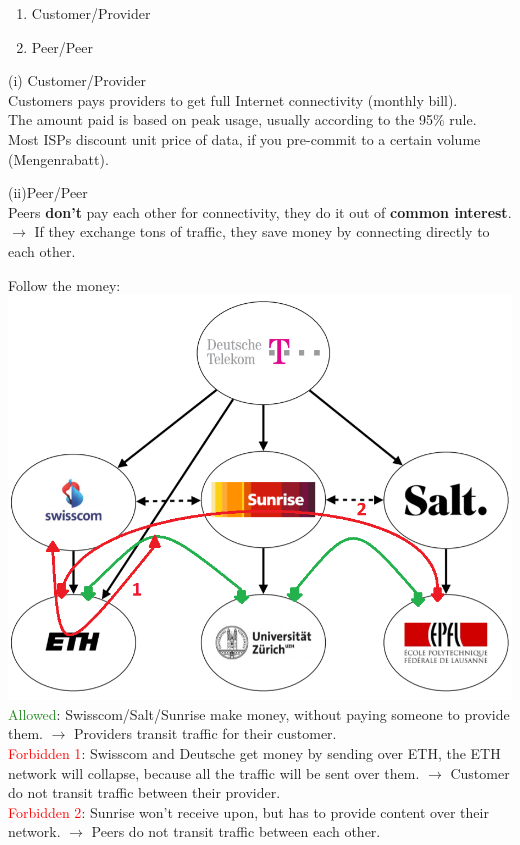 \documentclass[a4paper, fontsize=8pt, landscape, DIV=1]{scrartcl}
\begin{document}
\begin{multicols*}{4}
	 	\begin{enumerate}[label=(\roman*),noitemsep]
	 		\item Customer/Provider
	 		\item Peer/Peer
	 	\end{enumerate}
	 	(i) Customer/Provider\\
	 	Customers pays providers to get full Internet connectivity (monthly bill).\\
	 	The amount paid is based on peak usage, usually according to the 95\% rule.\\
	 	Most ISPs discount unit price of data, if you pre-commit to a certain volume (Mengenrabatt).\par 
	 	
	 	(ii)Peer/Peer\\
	 	Peers \textbf{don't} pay each other for connectivity, they do it out of \textbf{common interest}. $\rightarrow$ If they exchange tons of traffic, they save money by connecting directly to each other.\par 
	 	
	 	Follow the money:\\ 
	 	\includegraphics[width=\columnwidth]{images/Network_Layer/follow_the_money.png}
	 	\textcolor{ForestGreen}{Allowed}: Swisscom/Salt/Sunrise make money, without paying someone to provide them. $\rightarrow$ Providers transit traffic for their customer.\\ 
	 	\textcolor{Red}{Forbidden 1}: Swisscom and Deutsche get money by sending over ETH, the ETH network will collapse, because all the traffic will be sent over them. $\rightarrow$ Customer do not transit traffic between their provider.\\
	 	\textcolor{Red}{Forbidden 2}: Sunrise won't receive upon, but has to provide content over their network. $\rightarrow$ Peers do not transit traffic between each other.\par 
	 	

\end{multicols*}
\end{document}
